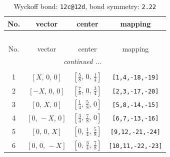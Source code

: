 \documentclass[fleqn,8pt]{jsarticle}
\begin{document}
\begin{longtable}{cccc}
\caption{Wyckoff bond: {\tt 12c@12d}, bond symmetry: {\tt 2.22}}
 \\
 \hline \hline
No. & vector & center & mapping \\ \hline \endfirsthead

\multicolumn{3}{l}{\tablename\ \thetable{}} \\
 \hline \hline
No. & vector & center & mapping \\ \hline \endhead

 \hline \hline
\multicolumn{3}{r}{\footnotesize\it continued ...} \\ \endfoot

 \hline \hline
\multicolumn{3}{r}{} \\ \endlastfoot

1 & $\left[ X,\, 0,\, 0 \right]$ & $\left[ \frac{5}{8},\, 0,\, \frac{1}{4} \right]$ & {\tt [1,4,-18,-19]} \\ \hline
2 & $\left[ - X,\, 0,\, 0 \right]$ & $\left[ \frac{7}{8},\, 0,\, \frac{3}{4} \right]$ & {\tt [2,3,-17,-20]} \\ \hline
3 & $\left[ 0,\, X,\, 0 \right]$ & $\left[ \frac{1}{4},\, \frac{5}{8},\, 0 \right]$ & {\tt [5,8,-14,-15]} \\ \hline
4 & $\left[ 0,\, - X,\, 0 \right]$ & $\left[ \frac{3}{4},\, \frac{7}{8},\, 0 \right]$ & {\tt [6,7,-13,-16]} \\ \hline
5 & $\left[ 0,\, 0,\, X \right]$ & $\left[ 0,\, \frac{1}{4},\, \frac{5}{8} \right]$ & {\tt [9,12,-21,-24]} \\ \hline
6 & $\left[ 0,\, 0,\, - X \right]$ & $\left[ 0,\, \frac{3}{4},\, \frac{7}{8} \right]$ & {\tt [10,11,-22,-23]} \\
\end{longtable}
\renewcommand{\arraystretch}{1.2}
\end{document}
